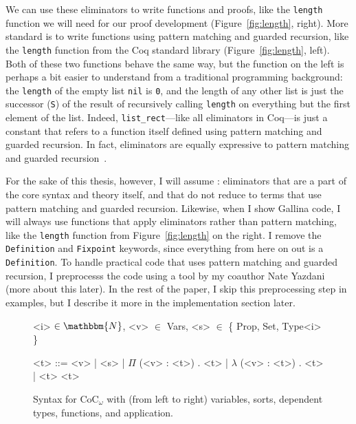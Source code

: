 We can use these eliminators to write functions and proofs, like the \lstinline{length} function we will need for our proof development (Figure~\ref{fig:length}, right).
More standard is to write functions using pattern matching and guarded recursion, like the \lstinline{length} function from the Coq standard library (Figure~\ref{fig:length}, left).
Both of these two functions behave the same way, but the function on the left is perhaps a bit easier to understand from a traditional programming background:
the \lstinline{length} of the empty list \lstinline{nil} is \lstinline{0}, and the length of any other list
is just the successor (\lstinline{S}) of the result of recursively calling \lstinline{length} on everything but the first element of the list.
Indeed, \lstinline{list_rect}---like all eliminators in Coq---is just a constant that refers to a function itself defined using pattern matching and guarded recursion.
In fact, eliminators are equally expressive to pattern matching and guarded recursion~\cite{TODO}. %

For the sake of this thesis, however, I will assume : eliminators that are a part of the core syntax and theory itself,
and that do not reduce to terms that use pattern matching and guarded recursion.
Likewise, when I show Gallina code, I will always use functions that apply eliminators rather than pattern matching, like the \lstinline{length} function from Figure~\ref{fig:length}
on the right.
I remove the \lstinline{Definition} and \lstinline{Fixpoint} keywords, since everything from here on out is a \lstinline{Definition}.
To handle practical code that uses pattern matching and guarded recursion,
I preprocesss the code using a tool by my coauthor Nate Yazdani (more about this later). %
In the rest of the paper, I skip this preprocessing step in examples, but I describe it more in the implementation section later.


\begin{figure*}
\small
\begin{grammar}
<i> $\in \mathbbm{N}$, <v> $\in$ Vars, <s> $\in$ \{ Prop, Set, Type<i> \}

<t> ::= <v> \hspace{0.06cm} | \hspace{0.06cm} <s> \hspace{0.06cm} | \hspace{0.06cm} $\Pi$ (<v> : <t>) . <t> \hspace{0.06cm} | \hspace{0.06cm} $\lambda$ (<v> : <t>) . <t> \hspace{0.06cm} | \hspace{0.06cm} <t> <t>
\end{grammar}
\vspace{-0.3cm}
\caption{Syntax for CoC$_\omega$ with (from left to right) variables, sorts, dependent types, functions, and application.}
\label{fig:coc-syntax}
\end{figure*}

